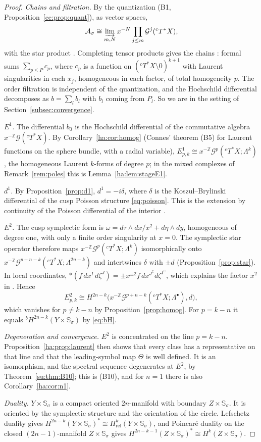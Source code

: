 \documentclass[11pt,oneside,reqno]{article}
\newcommand{\Z}{\mathbb Z}
\newcommand{\As}{\mathcal A_\sigma}
\newcommand{\cT}{{}^cT^*X}
\newcommand{\Ssig}{\mathbb S_\sigma}
\newcommand{\Hrel}{H_{\mathrm{rel}}}
\theoremstyle{plain}
\theoremstyle{definition}
\theoremstyle{remark}
\begin{document}
\begin{proof}
\emph{Chains and filtration.} By the quantization (B1,
Proposition~\ref{cc:prop:quant}), as vector spaces,
\[
 \As\cong\varinjlim_{m,N}x^{-N}\prod_{j\le m}\mathcal G^j(\cT),
\]
with the star product \cite[(37)]{MN}. Completing tensor products gives the
chains \cite[(38)]{MN}: formal sums
\(\sum_{p\le P}c_p\), where \(c_p\) is a function on \((\cT\setminus0)^{k+1}\)
with Laurent singularities in each \(x_j\), homogeneous in each factor,
of total homogeneity \(p\). The order filtration is independent of the
quantization, and the Hochschild differential decomposes as
\(b=\sum_lb_l\) with \(b_l\) coming from \(P_l\). So we are in the setting
of Section~\ref{subsec:convergence}.

\emph{\(E^1\).} The differential \(b_0\) is the Hochschild differential of
the commutative algebra \(x^{-\Z}\mathcal G(\cT)\). By
Corollary~\ref{ha:cor:homog} (Connes' theorem (B5) for Laurent functions on
the sphere bundle, with a radial variable), \(E^1_{p,k}\cong
x^{-\Z}\mathcal G^p(\cT;\Lambda^k)\), the homogeneous Laurent \(k\)-forms of
degree \(p\); in the mixed complexes of Remark~\ref{rem:poles} this is
Lemma~\ref{ha:lem:stageE1}.

\emph{\(d^1\).} By Proposition~\ref{prop:d1}, \(d^1=-i\delta\), where
\(\delta\) is the Koszul--Brylinski differential of the cusp Poisson
structure \eqref{eq:poisson}. This is the extension by continuity of the
Poisson differential of the interior \cite[p.~12]{MN}.

\emph{\(E^2\).} The cusp symplectic form is
\(\omega=d\tau\wedge dx/x^2+d\eta\wedge dy\), homogeneous of degree one,
with only a finite order singularity at \(x=0\). The symplectic star
operator therefore maps \(x^{-\Z}\mathcal G^p(\cT;\Lambda^k)\) isomorphically
onto \(x^{-\Z}\mathcal G^{p+n-k}(\cT;\Lambda^{2n-k})\) and intertwines
\(\delta\) with \(\pm d\) (Proposition~\ref{prop:star}). In local
coordinates, \(*(f\,dx^I\,d\zeta^J)=\pm x^{\pm2}f\,dx^{J^\complement}
d\zeta^{I^\complement}\), which explains the factor \(x^2\) in
\cite[p.~12]{MN}. Hence
\[
 E^2_{p,k}\cong H^{2n-k}\bigl(x^{-\Z}\mathcal G^{p+n-k}(\cT;\Lambda^\bullet),
 d\bigr),
\]
which vanishes for \(p\ne k-n\) by Proposition~\ref{prop:homog}. For
\(p=k-n\) it equals \({}^bH^{2n-k}(Y\times\Ssig)\) by \eqref{eq:bH}.

\emph{Degeneration and convergence.} \(E^2\) is concentrated on the line
\(p=k-n\). Proposition~\ref{ha:prop:laurent} then shows that every class
has a representative on that line and that the leading-symbol map
\(\Theta\) is well defined. It is an isomorphism, and the spectral
sequence degenerates at \(E^2\), by Theorem~\ref{su:thm:B10}; this is
(B10), and for \(n=1\) there is also Corollary~\ref{ha:cor:n1}.

\emph{Duality.} \(Y\times\Ssig\) is a compact oriented
\(2n\)-manifold with boundary \(Z\times\Ssig\). It is oriented by the
symplectic structure and the orientation of the circle. Lefschetz duality
gives \(H^{2n-k}(Y\times\Ssig)^*\cong\Hrel^k(Y\times\Ssig)\), and
Poincar\'e duality on the closed \((2n-1)\)-manifold \(Z\times\Ssig\) gives
\(H^{2n-k-1}(Z\times\Ssig)^*\cong H^k(Z\times\Ssig)\).
\end{proof}
\end{document}
